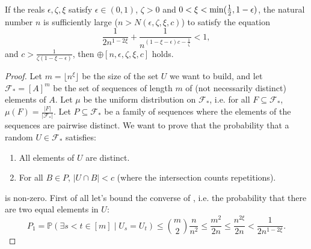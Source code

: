         \begin{lemma} \label{lem:n_large_enough_valid_values}
            If the reals $\epsilon, \zeta, \xi$ satisfy $\epsilon \in (0,1)$, $\zeta > 0$ and $0 < \xi < \min ( \frac{1}{2}, 1 - \epsilon )$,
            the natural number $n$ is sufficiently large ($n > N(\epsilon, \zeta, \xi, c)$) to satisfy the equation
                \begin{equation} \label{eq:n_large_enough_valid_values.1}
                    \frac{1}{2n^{1-2\xi}} + \frac{1}{n^{(1 - \xi - \epsilon)c - \frac{1}{\zeta}}} < 1,
                \end{equation}
            and $c > \frac{1}{\zeta (1 - \xi - \epsilon)}$,
            then $\oplus[n, \epsilon, \zeta, \xi, c]$ holds.
            \begin{proof}
                Let $m = \lfloor n^\xi \rfloor$ be the size of the set $U$ we want to build, and let $\mathcal{F}_* = [A]^m$ be
                the set of sequences of length $m$ of (not necessarily distinct) elements of $A$.
                Let $\mu$ be the uniform distribution on $\mathcal{F}_*$, i.e. for all $F \subseteq \mathcal{F}_*$,
                $\mu(F) = \frac{|F|}{|\mathcal{F}_*|}$.
                Let $P \subseteq \mathcal{F}_*$ be a family of sequences where the elements of the sequences are pairwise distinct.
                We want to prove that the probability that a random $U \in \mathcal{F}_*$ satisfies:
                \begin{enumerate}[label={\Roman*}., ref={\Roman*}, font=\rmfamily]
                    \item\label{itm:n_large_enough_valid_values.1} All elements of $U$ are distinct.
                    \item\label{itm:n_large_enough_valid_values.2} For all $B \in P$, $|U \cap B| < c$
                        (where the intersection counts repetitions).
                \end{enumerate}
                is non-zero.
                First of all let's bound the converse of , i.e. the probability that there are two equal elements
                in $U$: 
                \[
                    P_1 = \mathbb{P}(\exists s < t \in [m] \mid U_s = U_t)
                        \leq {m \choose 2} \frac{n}{n^2}
                        \leq \frac{m^2}{2n}
                        \leq \frac{n^{2\xi}}{2n}
                        < \frac{1}{2n^{1-2\xi}}.
\]
\end{proof}
\end{lemma}
